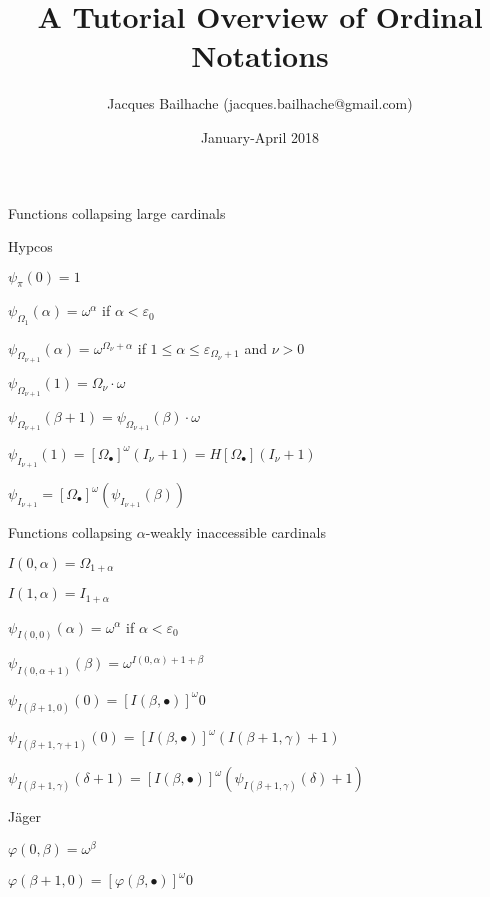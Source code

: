 \documentclass[10pt]{article}
\begin{document}
\title{A Tutorial Overview of Ordinal Notations}
\author{Jacques Bailhache (jacques.bailhache@gmail.com)}
\date{January-April 2018}

\maketitle

\setlength{\parindent}{0pt}

Functions collapsing large cardinals

\bigskip

Hypcos

\( \psi_\pi(0) = 1 \)

\( \psi_{\Omega_1}(\alpha) = \omega^\alpha \) if \( \alpha < \varepsilon_0 \)

\( \psi_{\Omega_{\nu+1}}(\alpha) = \omega^{\Omega_\nu+\alpha} \) if \( 1 \le \alpha \le \varepsilon_{\Omega_\nu+1} \) and \( \nu > 0 \)

\( \psi_{\Omega_{\nu+1}}(1) = \Omega_\nu \cdot \omega \)

\( \psi_{\Omega_{\nu+1}}(\beta+1) = \psi_{\Omega_{\nu+1}}(\beta) \cdot \omega \)

\( \psi_{I_{\nu+1}}(1) = [\Omega_\bullet]^\omega(I_\nu+1) = H [\Omega_\bullet] (I_\nu+1) \)

\( \psi_{I_{\nu+1}} = [\Omega_\bullet]^\omega (\psi_{I_{\nu+1}}(\beta)) \)

\bigskip

Functions collapsing \(\alpha\)-weakly inaccessible cardinals 

\( I(0,\alpha) = \Omega_{1+\alpha} \)

\( I(1,\alpha) = I_{1+\alpha} \)

\( \psi_{I(0,0)}(\alpha) = \omega^\alpha \) if \( \alpha < \varepsilon_0 \)

\( \psi_{I(0,\alpha+1)}(\beta) = \omega^{I(0,\alpha)+1+\beta} \)

\( \psi_{I(\beta+1,0)}(0) = [I(\beta,\bullet)]^\omega 0 \)

\( \psi_{I(\beta+1,\gamma+1)}(0) = [I(\beta,\bullet)]^\omega (I(\beta+1,\gamma)+1) \)

\( \psi_{I(\beta+1,\gamma)}(\delta+1) = [I(\beta,\bullet)]^\omega (\psi_{I(\beta+1,\gamma)}(\delta)+1) \)

\bigskip

Jäger

\( \varphi(0,\beta) = \omega^\beta \)

\( \varphi(\beta+1,0) = [\varphi(\beta,\bullet)]^\omega 0 \)
\end{document}
